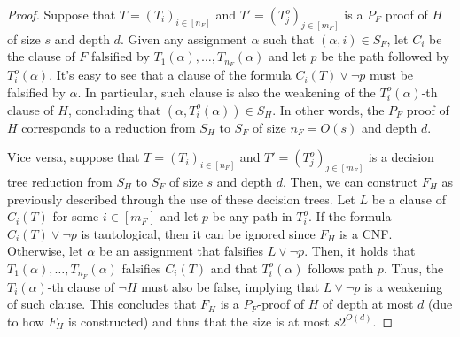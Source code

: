 \begin{proof}
 Suppose that $T = (T_i)_{i \in [n_F]}$ and $T' = (T_j^o)_{j \in [m_F]}$ is a $P_F$ proof of $H$ of size $s$ and depth $d$. Given any assignment $\alpha$ such that $(\alpha, i) \in S_F$, let $C_i$ be the clause of $F$ falsified by $T_1(\alpha), \ldots, T_{n_F}(\alpha)$ and let $p$ be the path followed by $T_i^o(\alpha)$. It's easy to see that a clause of the formula $C_i(T) \lor \lnot{p}$ must be falsified by $\alpha$. In particular, such clause is also the weakening of the $T_i^o(\alpha)$-th clause of $H$, concluding that $(\alpha, T_i^o(\alpha)) \in S_H$. In other words, the $P_F$ proof of $H$ corresponds to a reduction from $S_H$ to $S_F$ of size $n_F = O(s)$ and depth $d$.

 Vice versa, suppose that $T = (T_i)_{i \in [n_F]}$ and $T' = (T_j^o)_{j \in [m_F]}$ is a decision tree reduction from $S_H$ to $S_F$ of size $s$ and depth $d$. Then, we can construct $F_H$ as previously described through the use of these decision trees. Let $L$ be a clause of $C_i(T)$ for some $i \in [m_F]$ and let $p$ be any path in $T_i^o$. If the formula $C_i(T) \lor \lnot{p}$ is tautological, then it can be ignored since $F_H$ is a CNF. Otherwise, let $\alpha$ be an assignment that falsifies $L \lor \lnot{p}$. Then, it holds that $T_1(\alpha), \ldots, T_{n_F}(\alpha)$ falsifies $C_i(T)$ and that $T_i^o(\alpha)$ follows path $p$. Thus, the $T_i(\alpha)$-th clause of $\lnot{H}$ must also be false, implying that $L \lor \lnot{p}$ is a weakening of such clause. This concludes that $F_H$ is a $P_F$-proof of $H$ of depth at most $d$ (due to how $F_H$ is constructed) and thus that the size is at most $s2^{O(d)}$.

\end{proof}

\cleardoublepage